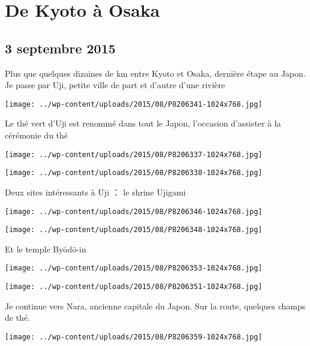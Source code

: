 \chapter{De Kyoto à Osaka}
\section*{3 septembre 2015}
Plus que quelques dizaines de km entre Kyoto et Osaka, dernière étape au Japon. \newline
 Je passe par Uji, petite ville de part et d'autre d'une rivière \newline
 \newline
\centerline{\texttt{[image: ../wp-content/uploads/2015/08/P8206341-1024x768.jpg]} } 
 \newline
 Le thé vert d'Uji est renommé dans tout le Japon, l'occasion d'assister à la cérémonie du thé \newline
 \newline
\centerline{\texttt{[image: ../wp-content/uploads/2015/08/P8206337-1024x768.jpg]} } 
 \newline
 \newline
\centerline{\texttt{[image: ../wp-content/uploads/2015/08/P8206338-1024x768.jpg]} } 
 \newline
 Deux sites intéressants à Uji ： le shrine Ujigami \newline
 \newline
\centerline{\texttt{[image: ../wp-content/uploads/2015/08/P8206346-1024x768.jpg]} } 
 \newline
 \newline
\centerline{\texttt{[image: ../wp-content/uploads/2015/08/P8206348-1024x768.jpg]} } 
 \newline
 Et le temple Byōdō-in \newline
 \newline
\centerline{\texttt{[image: ../wp-content/uploads/2015/08/P8206353-1024x768.jpg]} } 
 \newline
 \newline
\centerline{\texttt{[image: ../wp-content/uploads/2015/08/P8206351-1024x768.jpg]} } 
 \newline
 Je continue vers Nara, ancienne capitale du Japon. Sur la route, quelques champs de thé. \newline
 \newline
\centerline{\texttt{[image: ../wp-content/uploads/2015/08/P8206359-1024x768.jpg]} } 
